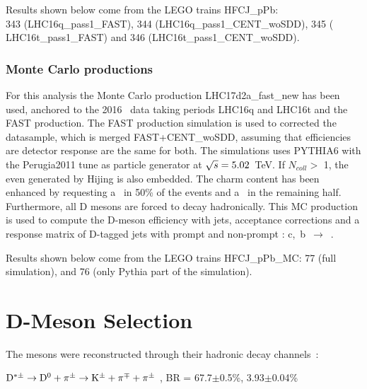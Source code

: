 Results shown below come from the LEGO trains HFCJ\_pPb: \\343 (LHC16q\_pass1\_FAST), 344 (LHC16q\_pass1\_CENT\_woSDD), 345 ( LHC16t\_pass1\_FAST) and 346 (LHC16t\_pass1\_CENT\_woSDD).

\subsubsection{Monte Carlo productions}

For this analysis the Monte Carlo production LHC17d2a\_fast\_new has been used, anchored to the 2016 \pPb\ data taking periods LHC16q and LHC16t and the FAST production. The FAST production simulation is used to corrected the datasample, which is merged FAST+CENT\_woSDD, assuming that efficiencies are detector response are the same for both.
The simulations uses PYTHIA6 with the Perugia2011 tune as particle generator at $\sqrt{s}=5.02$~TeV. If $N_{coll} > $ 1, the even generated by Hijing is also embedded.
The charm content has been enhanced by requesting a \ccbar\ in 50\% of the events and a \bbbar\ in the remaining half.
Furthermore, all D mesons are forced to decay hadronically.
This MC production is used to compute the D-meson efficiency with jets, acceptance corrections and a response matrix of D-tagged jets with prompt and non-prompt \Dstar: c,~b~$\rightarrow$~\Dstar.

Results shown below come from the LEGO trains HFCJ\_pPb\_MC: 77 (full simulation), and 76 (only Pythia part of the simulation).



\section{D-Meson Selection}
\label{sec:DmesonSel}
The \Dstar mesons were reconstructed through their hadronic decay channels~\cite{PDG:2016}:

\begin{center}
$\mathrm{D^{*\pm}} \to \mathrm{D^{0}} + \pi^{\pm} \to {\rm K}^{\pm} + \pi^{\mp}  + \pi^{\pm}$ , BR = 67.7$\pm$0.5\%, 3.93$\pm$0.04\%
\end{center}

